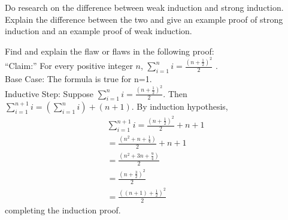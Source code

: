 


\begin{exercise}
Do research on the difference between weak induction and strong induction. Explain the difference between the two and give an example proof of strong induction and an example proof of weak induction.
\end{exercise}

\begin{exercise}
Find and explain the flaw or flaws in the following proof:\\
``Claim:'' For every positive integer $n$, $\sum^{n}_{i=1}i=\frac{(n+\frac{1}{2})^2}{2}$
.\\
Base Case: The formula is true for n=1.\\
Inductive Step:  Suppose $\sum^{n}_{i=1}i=\frac{(n+\frac{1}{2})^2}{2}$.  Then $\sum^{n+1}_{i=1}i=(\sum^{n}_{i=1}i) + (n+1)$.  By induction hypothesis, 
\begin{eqnarray*}
\sum^{n+1}_{i=1}i = \frac{(n+\frac{1}{2})^2}{2} +n+1\\
= \frac{(n^2+n+\frac{1}{4})}{2}+n+1 \\
=  \frac{(n^2+3n+\frac{9}{4})}{2} \\
= \frac{(n+\frac{3}{2})^2}{2} \\
= \frac{((n+1)+\frac{1}{2})^2}{2}
\end{eqnarray*}
completing the induction proof.
\end{exercise}




